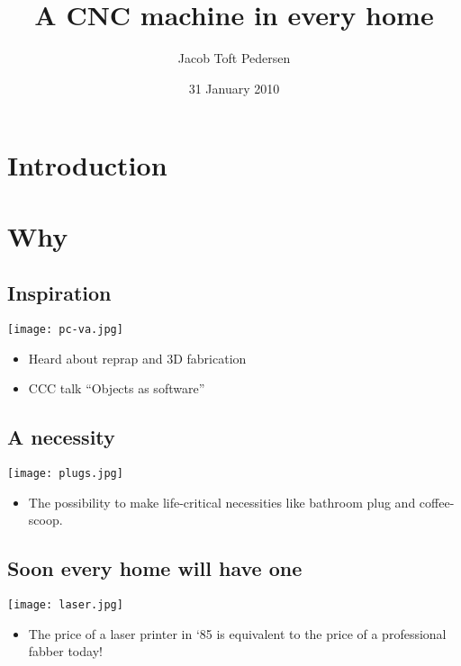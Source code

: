 \documentclass[11pt]{beamer}
\institute{Hack Århus}
\title{A CNC machine in every home}
\author{Jacob Toft Pedersen}
\date{31 January 2010}
\begin{document}
\maketitle

\setcounter{tocdepth}{3}
\tableofcontents
\vspace*{1cm}


\section{Introduction}
\label{sec-1}




\section{Why}
\label{sec-2}

\subsection*{Inspiration}\begin{frame}[fragile]
\label{sec-2.1}

\texttt{[image: pc-va.jpg]}
\begin{itemize}
\item Heard about reprap and 3D fabrication
\item CCC talk ``Objects as software''
\end{itemize}
\end{frame}
\subsection*{A necessity}\begin{frame}[fragile]
\label{sec-2.2}

\texttt{[image: plugs.jpg]}
\begin{itemize}
\item The possibility to make life-critical necessities like bathroom
     plug and coffee-scoop.
\end{itemize}
\end{frame}
\subsection*{Soon every home will have one}\begin{frame}[fragile]
\label{sec-2.3}

\texttt{[image: laser.jpg]}
\begin{itemize}
\item The price of a laser printer in `85 is equivalent to the price of a
     professional fabber today!
\end{itemize}
\end{frame}
\end{document}
